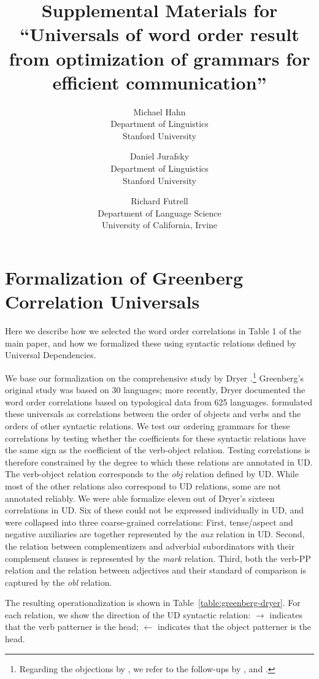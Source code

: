 \documentclass[10pt,twoside,lineno]{article}
\title{Supplemental Materials for ``Universals of word order result from optimization of grammars for efficient communication''}
\author{
        Michael Hahn \\
                Department of Linguistics\\
       Stanford University
            \and
       Daniel Jurafsky\\
       Department of Linguistics\\
       Stanford University \\
       \and
       Richard Futrell\\
       Department of Language Science\\
       University of California, Irvine
}
\begin{document}
\maketitle




\tableofcontents


\section{Formalization of Greenberg Correlation Universals}\label{sec:correlations}


Here we describe how we selected the word order correlations in Table 1 of the main paper, and how we formalized these using syntactic relations defined by Universal Dependencies.

We base our formalization on the comprehensive study by Dryer \cite{dryer1992greenbergian}.\footnote{Regarding the objections by \citet{dunn2011evolved}, we refer to the follow-ups by \citet{levy2011computational}, and \citet{croft2011greenbergian}.}
Greenberg's original study was based on 30 languages; more recently, Dryer \cite{dryer1992greenbergian} documented the word order correlations based on typological data from 625 languages.
\citet{dryer1992greenbergian} formulated these universals as correlations between the order of objects and verbs and the orders of other syntactic relations.
We test our ordering grammars for these correlations by testing whether the coefficients for these syntactic relations have the same sign as the coefficient of the verb-object relation.
Testing correlations is therefore constrained by the degree to which these relations are annotated in UD.
The verb-object relation corresponds to the  \emph{obj} relation defined by UD.
While most of the other relations also correspond to UD relations, some are not annotated reliably.
We were able formalize eleven out of Dryer's sixteen correlations in UD.
Six of these could not be expressed individually in UD, and were collapsed into three coarse-grained correlations:
First, tense/aspect and negative auxiliaries are together represented by the \emph{aux} relation in UD.
Second, the relation between complementizers and adverbial subordinators with their complement clauses is represented by the \emph{mark} relation.
Third, both the verb-PP relation and the relation between adjectives and their standard of comparison is captured by the \emph{obl} relation.

The resulting operationalization is shown in Table~\ref{table:greenberg-dryer}.
For each relation, we show the direction of the UD syntactic relation: $\rightarrow$ indicates that the verb patterner is the head; $\leftarrow$ indicates that the object patterner is the head.
\end{document}
